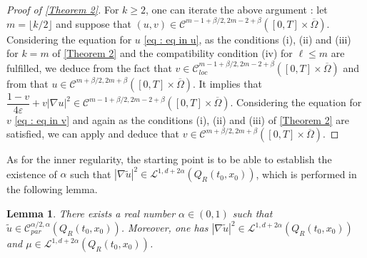 \documentclass[reqno,12pt,twoside]{amsart}
\newtheorem{lemma}{Lemma}[section]
\numberwithin{equation}{section} \numberwithin{theorem}{section}
\numberwithin{proposition}{section} \numberwithin{lemma}{section}
\numberwithin{corollary}{section}
\numberwithin{definition}{section} \numberwithin{remark}{section}
\begin{document}
\begin{proof}[Proof of \autoref{Theorem 2}]
For $k\geqslant 2$, one can iterate the above argument : let $m = \lfloor k/2\rfloor$ and suppose that $(u,v) \in \mathcal{C}^{m -1 + \beta/2, 2m-2 +\beta}([0,T]\times \overline{\Omega})$. Considering the equation for $u$ \eqref{eq : eq in u}, as the conditions (i), (ii) and (iii) for $k=m$ of \autoref{Theorem 2} and the compatibility condition (iv) for $\ell \leqslant m$ are fulfilled, we deduce from the fact that $v\in \mathcal{C}_{loc}^{m -1 + \beta/2, 2m-2 +\beta}([0,T]\times \overline{\Omega})$ and from \cite[Section IV, Theorem 5.2]{LSU68} that $u\in \mathcal{C}^{m+\beta/2, 2m+\beta}([0,T]\times \overline{\Omega})$.
It implies that $\dfrac{1-v}{4\varepsilon} + v|\nabla u|^2\in \mathcal{C}^{m-1+\beta/2, 2m-2+\beta}([0,T]\times \overline{\Omega})$. 
Considering the equation for $v$ \eqref{eq : eq in v} and again as the conditions (i), (ii) and (iii) of \autoref{Theorem 2} are satisfied, we can apply \cite[Section IV, Theorem 5.2]{LSU68} and deduce that $v\in \mathcal{C}^{m+\beta/2, 2m+\beta}([0,T]\times \overline{\Omega})$. 
%
%
%
\end{proof}


As for the inner regularity, the starting point is to be able to establish the existence of $\alpha$ such that $|\nabla \widetilde{u}|^2\in \mathcal{L}^{1,d+2\alpha} (Q_R(t_0,x_0))$, which is performed in the following lemma. 

\begin{lemma}\label{lem : tilu morrey}
There exists a real number $\alpha \in (0,1)$ such that $\widetilde{u}\in \mathcal{C}_{par}^{\alpha/2,\alpha} (Q_R(t_0,x_0))$. 
Moreover, one has $|\nabla \widetilde{u}|^2 \in \mathcal{L}^{1,d+2\alpha}(Q_R(t_0,x_0))$ and $\mu \in \mathcal{L}^{1, d+2\alpha}(Q_R(t_0,x_0))$. 
\end{lemma} 
\end{document}
